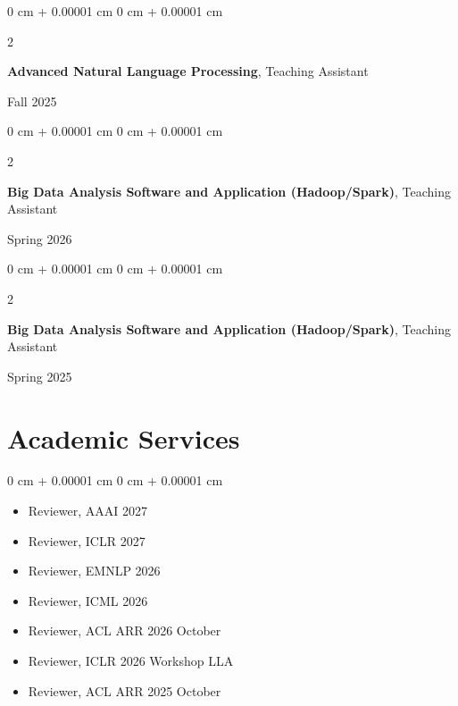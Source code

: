 \documentclass[10pt, letterpaper]{article}
\newenvironment{highlights}{
    \begin{itemize}[
        topsep=0.10 cm,
        parsep=0.10 cm,
        partopsep=0pt,
        itemsep=0pt,
        leftmargin=0 cm + 10pt
    ]
}{
    \end{itemize}
} %
\newenvironment{onecolentry}{
    \begin{adjustwidth}{
        0 cm + 0.00001 cm
    }{
        0 cm + 0.00001 cm
    }
}{
    \end{adjustwidth}
} %
\newenvironment{twocolentry}[2][]{
    \onecolentry
    \def\secondColumn{#2}
    \setcolumnwidth{\fill, 4.5 cm}
    \begin{paracol}{2}
}{
    \switchcolumn \raggedleft \secondColumn
    \end{paracol}
    \endonecolentry
} %
\begin{document}
        \vspace{0.10 cm}
        \begin{twocolentry}{Fall 2025}
            \textbf{Advanced Natural Language Processing}, Teaching Assistant
        \end{twocolentry}

        \vspace{0.10 cm}
        \begin{twocolentry}{Spring 2026}
            \textbf{Big Data Analysis Software and Application (Hadoop/Spark)}, Teaching Assistant
        \end{twocolentry}

        \vspace{0.10 cm}
        \begin{twocolentry}{Spring 2025}
            \textbf{Big Data Analysis Software and Application (Hadoop/Spark)}, Teaching Assistant
        \end{twocolentry}

    \section{Academic Services}
        \begin{onecolentry}
            \begin{highlights}
                \item Reviewer, AAAI 2027
                \item Reviewer, ICLR 2027
                \item Reviewer, EMNLP 2026
                \item Reviewer, ICML 2026
                \item Reviewer, ACL ARR 2026 October
                \item Reviewer, ICLR 2026 Workshop LLA
                \item Reviewer, ACL ARR 2025 October
            \end{highlights}
        \end{onecolentry}
\end{document}
